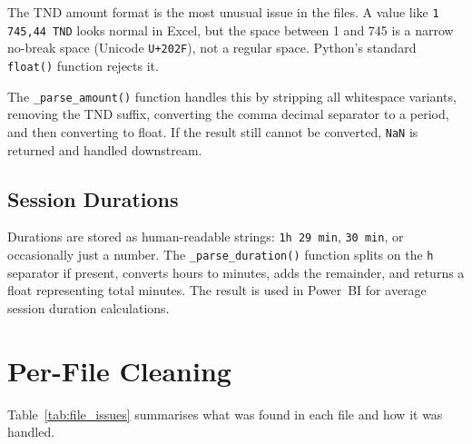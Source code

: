 \documentclass[12pt, a4paper]{report}
\begin{document}
The TND amount format is the most unusual issue in the files. A value like
\texttt{1 745,44 TND} looks normal in Excel, but the space between 1 and 745 is a
narrow no-break space (Unicode \texttt{U+202F}), not a regular space. Python's
standard \texttt{float()} function rejects it.

The \texttt{\_parse\_amount()} function handles this by stripping all whitespace
variants, removing the TND suffix, converting the comma decimal separator to a period,
and then converting to float. If the result still cannot be converted, \texttt{NaN}
is returned and handled downstream.

\subsection{Session Durations}

Durations are stored as human-readable strings: \texttt{1h 29 min}, \texttt{30 min},
or occasionally just a number. The \texttt{\_parse\_duration()} function splits on
the \texttt{h} separator if present, converts hours to minutes, adds the remainder,
and returns a float representing total minutes. The result is used in Power~BI
for average session duration calculations.

\section{Per-File Cleaning}

Table~\ref{tab:file_issues} summarises what was found in each file and how it was
handled.
\end{document}
